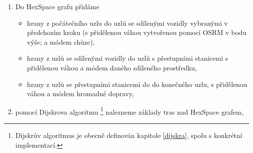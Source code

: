 \documentclass[thesis=M,czech]{FITthesis}[2019/12/23]
\theoremstyle{plain}
\theoremstyle{definition}
\begin{document}
\begin{enumerate}
\begin{itemize}
	\end{itemize}

	\item Do HexSpace grafu přidáme

	\begin{itemize}
		\item hrany z počátečního uzlu do uzlů se sdílenými vozidly vybranými v předchozím kroku (s přidělenou váhou vytvořenou pomocí OSRM v bodu výše; a módem chůze),
		\item hrany z uzlů se sdílenými vozidly do uzlů s přestupními stanicemi s přidělenou váhou a módem daného sdíleného prostředku,
		\item hrany z uzlů se přestupními stanicemi do do konečného uzlu, s přidělenou váhou a módem hromadné dopravy,
	\end{itemize}

	\item pomocí Dijskrova algoritmu \footnote{Dijskrův algoritmus je obecně definován kapitole \ref{dijskra}, spolu s konkrétní implementací.} nalezneme základy tras nad HexSpace grafem,


\end{enumerate}
\end{document}
